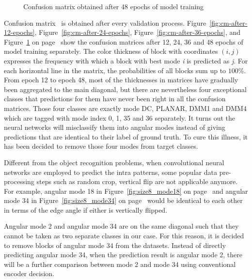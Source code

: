 \begin{figure}
\begin{minipage}{0.49\textwidth}
        \caption[Confusion matrix obtained after 48 epochs of model training]
        {Confusion matrix obtained after 48 epochs of model training}
        \label{fig:cm-after-48-epochs}
    \end{minipage}
\end{figure}
Confusion matrix~\parencite{RN216} is obtained after 
every validation process.
Figure~\ref{fig:cm-after-12-epochs},
Figure~\ref{fig:cm-after-24-epochs},
Figure~\ref{fig:cm-after-36-epochs}, and
Figure~\ref{fig:cm-after-48-epochs}
on page~\pageref{fig:cm-after-12-epochs}
show the confusion matrices
after 12, 24, 36 and 48 epochs of model training
separately.
The color thickness of block with coordinates $(i,j)$
expresses the frequency with which a block with best 
mode \emph{i} is predicted as \emph{j}.
For each horizontal line in the matrix, 
the probabilities of all blocks sum up to $100\%$.
From epoch 12 to epoch 48, most of the thicknesses 
in matrices have gradually been aggregated to 
the main diagonal, but there are nevertheless
four exceptional classes that predictions for them
have never been right in all the confusion matrices.
Those four classes are exactly mode DC, PLANAR, 
DMM1 and DMM4 which are tagged with mode index 
0, 1, 35 and 36 separately.
It turns out the neural networks will misclassify 
them into angular modes instead of giving 
predictions that are identical to their label 
of ground truth.
To cure this illness, it has been decided to
remove those four modes from target classes.

Different from the object recognition problems,
when convolutional neural networks are employed to 
predict the intra patterns, some popular data pre-processing
steps such as random crop, vertical flip
are not applicable anymore.
For example, angular mode 18 in Figure~\ref{fig:size8_mode18}
on page~\pageref{fig:size8_mode18} and angular mode 34 in
Figure~\ref{fig:size8_mode34} on page~\pageref{fig:size8_mode34}
would be identical to each other in terms of the edge angle
if either is vertically flipped.

Angular mode 2 and angular mode 34 are
on the same diagonal such that they cannot 
be taken as two separate classes in our case.
For this reason, it is decided to remove
blocks of angular mode 34
from the datasets.
Instead of directly predicting angular mode 34,
when the prediction result is angular mode 2,
there will be
a further comparison between mode 2 and mode 34 
using conventional encoder decision.

